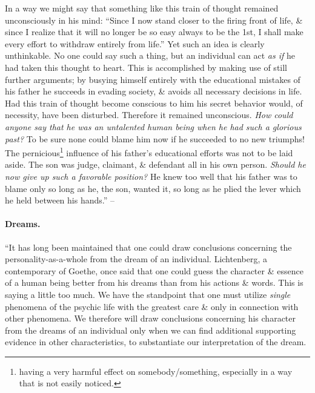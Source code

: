 \documentclass{article}
\begin{document}
In a way we might say that something like this train of thought remained unconsciously in his mind: ``Since I now stand closer to the firing front of life, \& since I realize that it will no longer be so easy always to be the 1st, I shall make every effort to withdraw entirely from life.'' Yet such an idea is clearly unthinkable. No one could say such a thing, but an individual can act {\it as if} he had taken this thought to heart. This is accomplished by making use of still further arguments; by busying himself entirely with the educational mistakes of his father he succeeds in evading society, \& avoids all necessary decisions in life. Had this train of thought become conscious to him his secret behavior would, of necessity, have been disturbed. Therefore it remained unconscious. {\it How could anyone say that he was an untalented human being when he had such a glorious past?} To be sure none could blame him now if he succeeded to no new triumphs! The pernicious\footnote{having a very harmful effect on somebody/something, especially in a way that is not easily noticed.} influence of his father's educational efforts was not to be laid aside. The son was judge, claimant, \& defendant all in his own person. {\it Should he now give up such a favorable position?} He knew too well that his father was to blame only so long as he, the son, wanted it, so long as he plied the lever which he held between his hands.'' -- \cite[pp. 97--107]{Adler_human_nature}

\paragraph{Dreams.} ``It has long been maintained that one could draw conclusions concerning the personality-as-a-whole from the dream of an individual. Lichtenberg, a contemporary of Goethe, once said that one could guess the character \& essence of a human being better from his dreams than from his actions \& words. This is saying a little too much. We have the standpoint that one must utilize {\it single} phenomena of the psychic life with the greatest care \& only in connection with other phenomena. We therefore will draw conclusions concerning his character from the dreams of an individual only when we can find additional supporting evidence in other characteristics, to substantiate our interpretation of the dream.
\end{document}
